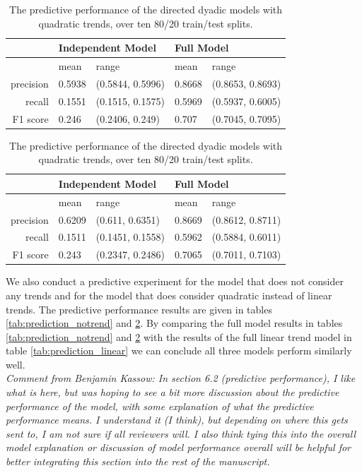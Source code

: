 \documentclass[headsepline=true, abstracton]{scrartcl}
\begin{document}
\begin{table}[H]
\centering
\begin{tabular}{rllll}
\hline \hline
& \multicolumn{2}{l}{Independent Model } & \multicolumn{2}{l}{Full Model} \\ \hline 
 & mean & range & mean & range \\ 
  \hline
precision & 0.5938 & (0.5844, 0.5996) & 0.8668 & (0.8653, 0.8693) \\ 
  recall & 0.1551 & (0.1515, 0.1575) & 0.5969 & (0.5937, 0.6005) \\ 
  F1 score & 0.246 & (0.2406, 0.249) & 0.707 & (0.7045, 0.7095) \\  
   \hline \hline
\end{tabular}
\caption{The predictive performance of the directed dyadic models with no trends, over ten 80/20 train/test splits.}
\label{tab:prediction_notrend}
\vspace{0.4cm}
\begin{tabular}{rllll}
\hline \hline
& \multicolumn{2}{l}{Independent Model } & \multicolumn{2}{l}{Full Model} \\ \hline 
 & mean & range & mean & range \\ 
  \hline
precision & 0.6209 & (0.611, 0.6351) & 0.8669 & (0.8612, 0.8711) \\ 
  recall & 0.1511 & (0.1451, 0.1558) & 0.5962 & (0.5884, 0.6011) \\ 
  F1 score & 0.243 & (0.2347, 0.2486) & 0.7065 & (0.7011, 0.7103) \\ 
   \hline \hline
\end{tabular}
\caption{The predictive performance of the directed dyadic models with quadratic trends, over ten 80/20 train/test splits.}
\label{tab:prediction_quadratic}
\end{table}
We also conduct a predictive experiment for the model that does not consider any trends and for the model that does consider quadratic instead of linear trends. The predictive performance results are given in tables \ref{tab:prediction_notrend} and \ref{tab:prediction_quadratic}. By comparing the full model results in tables \ref{tab:prediction_notrend} and \ref{tab:prediction_quadratic} with the results of the full linear trend model in table \ref{tab:prediction_linear} we can conclude all three models perform similarly well.   \\[0,5cm]


\textit{Comment from Benjamin Kassow: In section 6.2 (predictive performance), I like what is here, but was hoping to see a bit more discussion about the predictive 
performance of the model, with some explanation of what the predictive performance means. 
I understand it (I think), but depending on where this gets sent to, I am not sure if all reviewers will. 
I also think tying this into the overall model explanation or discussion of model performance overall will be helpful for better 
integrating this section into the rest of the manuscript.}
  
\end{document}
